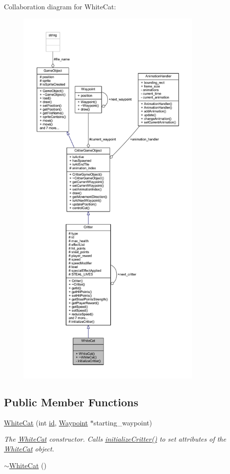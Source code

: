Collaboration diagram for White\+Cat\+:\nopagebreak
\begin{figure}[H]
\begin{center}
\leavevmode
\includegraphics[height=550pt]{class_white_cat__coll__graph}
\end{center}
\end{figure}
\subsection*{Public Member Functions}
\begin{DoxyCompactItemize}
\item 
\hyperlink{class_white_cat_a1af91c1252fac9ac94a9334bff97f6df}{White\+Cat} (int \hyperlink{class_critter_ae775e0ebe6e8bbe249c403670bda46f8}{id}, \hyperlink{class_waypoint}{Waypoint} $\ast$starting\+\_\+waypoint)
\begin{DoxyCompactList}\small\item\em The \hyperlink{class_white_cat}{White\+Cat} constructor. Calls \hyperlink{class_white_cat_a0a3c801e7a6b451b2b1caef9da137585}{initialize\+Critter()} to set attributes of the \hyperlink{class_white_cat}{White\+Cat} object. \end{DoxyCompactList}\item 
\hyperlink{class_white_cat_aa69986549bb464efd356e3143edfd830}{$\sim$\+White\+Cat} ()
\end{DoxyCompactItemize}
